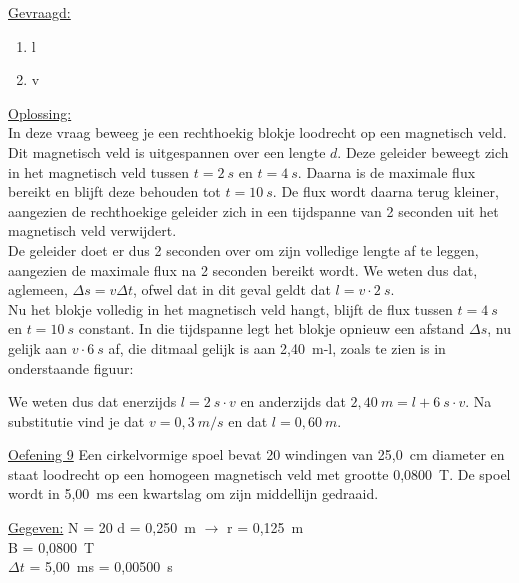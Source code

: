 \documentclass[a4paper,12pt,twoside]{article}%
\begin{document}
\underline{Gevraagd:}
\begin{enumerate}
	\item l
	\item v
\end{enumerate} 
\underline{Oplossing:}\\
In deze vraag beweeg je een rechthoekig blokje loodrecht op een magnetisch veld. Dit magnetisch veld is uitgespannen over een lengte $d$. Deze geleider beweegt zich in het magnetisch veld tussen $t=2~s$ en  $t=4~s$. Daarna is de maximale flux bereikt en blijft deze behouden tot $t= 10~s$. De flux wordt daarna terug kleiner, aangezien de rechthoekige geleider zich in een tijdspanne van 2 seconden uit het magnetisch veld verwijdert. \\
De geleider doet er dus 2 seconden over om zijn volledige lengte af te leggen, aangezien de maximale flux na 2 seconden bereikt wordt. We weten dus dat, aglemeen, $\Delta s = v\Delta t$, ofwel dat in dit geval geldt dat $l = v\cdot 2~s$.\\
Nu het blokje volledig in het magnetisch veld hangt, blijft de flux tussen $t=4~s$ en $t=10~s$ constant. In die tijdspanne legt het blokje opnieuw een afstand $\Delta s$, nu gelijk aan $v\cdot 6~s$ af, die ditmaal gelijk is aan 2,40~m-l, zoals te zien is in onderstaande figuur:
\begin{figure}[!h]
	\centering
\end{figure}
We weten dus dat enerzijds $l = 2~s\cdot v$ en anderzijds dat $2,40~m=l+6~s\cdot v$. Na substitutie vind je dat $v = 0,3~m/s$ en dat $l=0,60~m$.
\newpage


\underline{Oefening 9}
Een cirkelvormige spoel bevat 20 windingen van 25,0~cm diameter en staat loodrecht op een homogeen magnetisch veld met grootte 0,0800~T. De spoel wordt in 5,00~ms een kwartslag om zijn middellijn gedraaid.


\underline{Gegeven:}\newline
N = 20\newline
d = 0,250~m $\rightarrow$ r = 0,125~m\\
B = 0,0800~T\\
$\Delta t$ = 5,00~ms = 0,00500~s
\end{document}
